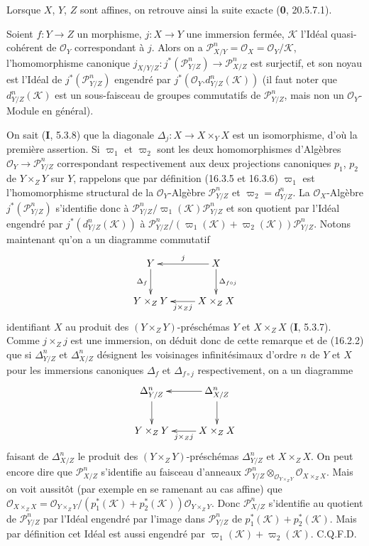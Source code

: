 Lorsque $X$, $Y$, $Z$ sont affines, on retrouve ainsi la suite exacte
(\textbf{0}, 20.5.7.1).

\begin{proposition}[16.4.20]
\label{IV.16.4.20}
Soient $f:Y\to Z$ un morphisme, $j:X\to Y$ une immersion fermée,
$\mathscr{K}$ l'Idéal quasi-cohérent de $\mathcal{O}_Y$ correspondant à $j$.
Alors on a
$\mathscr{P}_{X/Y}^n=\mathcal{O}_X=\mathcal{O}_Y/\mathscr{K}$,
l'homomorphisme canonique
$j_{X/Y/Z}:j^*(\mathscr{P}_{Y/Z}^n)\to\mathscr{P}_{X/Z}^n$ est surjectif, et
son noyau est l'Idéal de $j^*(\mathscr{P}_{Y/Z}^n)$ engendré par
$j^*(\mathcal{O}_Y.d_{Y/Z}^n(\mathscr{K}))$ (il faut noter que
$d_{Y/Z}^n(\mathscr{K})$ est un sous-faisceau de groupes commutatifs de
$\mathscr{P}_{Y/Z}^n$, mais non un $\mathcal{O}_Y$-Module en général).
\end{proposition}

On sait (\textbf{I}, 5.3.8) que la diagonale
$\Delta_j:X\to X\times_Y X$ est un isomorphisme, d'où la première assertion.
Si $\varpi_1$ et $\varpi_2$ sont les deux homomorphismes d'Algèbres
$\mathcal{O}_Y\to\mathscr{P}_{Y/Z}^n$ correspondant respectivement aux deux
projections canoniques $p_1$, $p_2$ de $Y\times_Z Y$ sur $Y$, rappelons que
par définition (16.3.5 et 16.3.6) $\varpi_1$ est l'homomorphisme structural de
la $\mathcal{O}_Y$-Algèbre $\mathscr{P}_{Y/Z}^n$ et
$\varpi_2=d_{Y/Z}^n$. La $\mathcal{O}_X$-Algèbre
$j^*(\mathscr{P}_{Y/Z}^n)$ s'identifie donc à
$\mathscr{P}_{Y/Z}^n/\varpi_1(\mathscr{K})\mathscr{P}_{Y/Z}^n$ et son quotient
par l'Idéal engendré par $j^*(d_{Y/Z}^n(\mathscr{K}))$ à
$\mathscr{P}_{Y/Z}^n/(\varpi_1(\mathscr{K})+\varpi_2(\mathscr{K}))\mathscr{P}_{Y/Z}^n$.
Notons maintenant qu'on a un diagramme commutatif
\[
  \xymatrix{
    Y\ar[d]_-{\Delta_f}&X\ar[l]_-j\ar[d]^-{\Delta_{f\circ j}}\\
    Y\times_Z Y&X\times_Z X\ar[l]^-{j\times_Z j}
  }
\]
identifiant $X$ au produit des $(Y\times_Z Y)$-préschémas $Y$ et
$X\times_Z X$ (\textbf{I}, 5.3.7). Comme $j\times_Z j$ est une immersion, on déduit
donc de cette remarque et de (16.2.2) que si $\Delta_{Y/Z}^n$ et
$\Delta_{X/Z}^n$ désignent les voisinages infinitésimaux d'ordre $n$ de $Y$
et $X$ pour les immersions canoniques $\Delta_f$ et $\Delta_{f\circ j}$
respectivement, on a un diagramme
\[
  \xymatrix{
    \Delta_{Y/Z}^n\ar[d]&\Delta_{X/Z}^n\ar[l]\ar[d]\\
    Y\times_Z Y&X\times_Z X\ar[l]^-{j\times_Z j}
  }
\]
faisant de $\Delta_{X/Z}^n$ le produit des $(Y\times_Z Y)$-préschémas
$\Delta_{Y/Z}^n$ et $X\times_Z X$. On peut encore dire que
$\mathscr{P}_{X/Z}^n$ s'identifie au faisceau d'anneaux
$\mathscr{P}_{Y/Z}^n\otimes_{\mathcal{O}_{Y\times_Z Y}}
\mathcal{O}_{X\times_Z X}$. Mais on voit aussitôt (par exemple en se ramenant
au cas affine) que
$\mathcal{O}_{X\times_Z X}=\mathcal{O}_{Y\times_Z Y}/(p_1^*(\mathscr{K})+p_2^*(\mathscr{K}))\mathcal{O}_{Y\times_Z Y}$.
Donc $\mathscr{P}_{X/Z}^n$ s'identifie au quotient de
$\mathscr{P}_{Y/Z}^n$ par l'Idéal engendré par l'image dans
$\mathscr{P}_{Y/Z}^n$ de $p_1^*(\mathscr{K})+p_2^*(\mathscr{K})$. Mais par
définition cet Idéal est aussi engendré par
$\varpi_1(\mathscr{K})+\varpi_2(\mathscr{K})$. C.Q.F.D.

